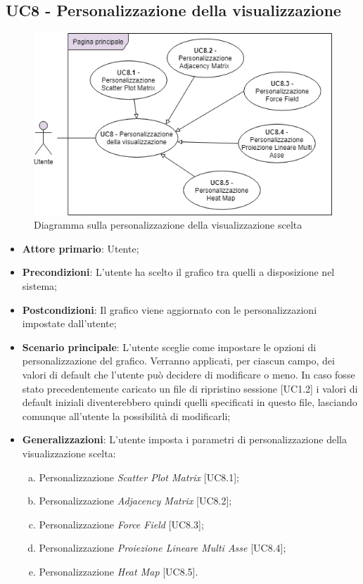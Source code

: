 \subsection{UC8 - Personalizzazione della visualizzazione}
\begin{figure}[h]
\includegraphics[width=\linewidth]{Section/Images/UC8.png}
\centering
\caption{Diagramma sulla personalizzazione della visualizzazione scelta}
\end{figure}
\begin{itemize}
	\item \textbf{Attore primario}: Utente;
	
	\item \textbf{Precondizioni}: L'utente ha scelto il grafico tra quelli a disposizione nel sistema;
	
	\item \textbf{Postcondizioni}: Il grafico viene aggiornato con le personalizzazioni impostate dall'utente;
	
	\item \textbf{Scenario principale}: L’utente sceglie come impostare le opzioni di personalizzazione del grafico. Verranno applicati, per ciascun campo, dei valori di default che l'utente può decidere di modificare o meno. In caso fosse stato precedentemente caricato un file di ripristino sessione [UC1.2] i valori di default iniziali diventerebbero quindi quelli specificati in questo file, lasciando comunque all'utente la possibilità di modificarli;
	
	\item \textbf{Generalizzazioni}: L'utente imposta i parametri di personalizzazione della visualizzazione scelta:
	\begin{enumerate}[(a)]
	\item Personalizzazione \textit{Scatter Plot Matrix} [UC8.1];
	\item Personalizzazione \textit{Adjacency Matrix} [UC8.2];
	\item Personalizzazione \textit{Force Field} [UC8.3];
	\item Personalizzazione \textit{Proiezione Lineare Multi Asse} [UC8.4];
	\item Personalizzazione \textit{Heat Map} [UC8.5].
	\end{enumerate}
		
\end{itemize}


